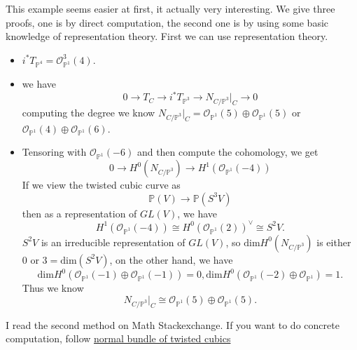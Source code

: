 \documentclass[../main.tex]{subfiles}
\begin{document}
\begin{example}
This example seems easier at first, it actually very interesting. We give three proofs, one is by direct computation, the second one is by using some basic knowledge of representation theory.
First we can use representation theory.
\begin{itemize}
\item $i^{*}T_{\mathbb{P}^{4}}=\mathcal{O}_{\mathbb{P}^{1}}^{3}(4).$
\item we have 
$$0\rightarrow T_{C}\rightarrow i^{*}T_{\mathbb{P}^{3}}\rightarrow N_{C/\mathbb{P}^{3}}|_{C}\rightarrow 0$$
computing the degree we know $N_{C/\mathbb{P}^{3}}|_{C}= \mathcal{O}_{\mathbb{P}^{1}}(5)\oplus \mathcal{O}_{\mathbb{P}^{1}}(5)$ or $\mathcal{O}_{\mathbb{P}^{1}}(4)\oplus \mathcal{O}_{\mathbb{P}^{1}}(6)$.
\item Tensoring with $\mathcal{O}_{\mathbb{P}^{1}}(-6)$ and then compute the cohomology, we get 
$$0 \rightarrow H^{0}(N_{C/\mathbb{P}^{3}})\rightarrow H^{1}(\mathcal{O}_{\mathbb{P}^{1}}(-4))$$
If we view the twisted cubic curve as 
$$\mathbb{P}(V)\rightarrow \mathbb{P}(S^{3}V)$$
then as a representation of $GL(V)$, we have 
$$H^{1}(\mathcal{O}_{\mathbb{P}^{1}}(-4))\cong H^{0}(\mathcal{O}_{\mathbb{P}^{1}}(2))^{\vee}\cong S^{2}V.$$
$S^{2}V$ is an irreducible representation of $GL(V)$, so $\mathrm{dim}H^{0}(N_{C/\mathbb{P}^{3}})$ is either $0$ or $3=\mathrm{dim}(S^{2}V)$, on the other hand, we have 
$$\mathrm{dim}H^{0}(\mathcal{O}_{\mathbb{P}^{1}}(-1)\oplus \mathcal{O}_{\mathbb{P}^{1}}(-1))=0, \mathrm{dim}H^{0}(\mathcal{O}_{\mathbb{P}^{1}}(-2)\oplus \mathcal{O}_{\mathbb{P}^{1}})=1.$$
Thus we know $$N_{C/\mathbb{P}^{3}}|_{C}\cong \mathcal{O}_{\mathbb{P}^{1}}(5)\oplus \mathcal{O}_{\mathbb{P}^{1}}(5).$$
\end{itemize}
I read the second method on Math Stackexchange. If you want to do concrete computation, follow \href{http://math.stackexchange.com/questions/1583326/normal-bundle-of-twisted-cubic/1603525#1603525}{normal bundle of twisted cubics}


\end{example}
\end{document}
